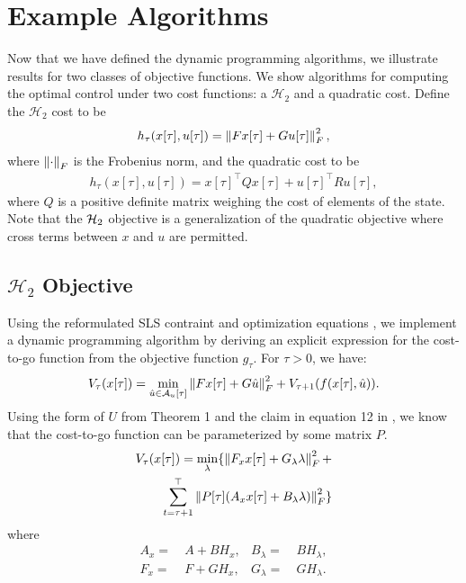 \section{Example Algorithms}\label{sec:examples}
Now that we have defined the dynamic programming algorithms, we illustrate results for two classes of objective functions.
We show algorithms for computing the optimal control under two cost functions: a $\mathcal{H}_2$ and a quadratic cost.
Define the $\mathcal{H}_2$ cost to be 
\begin{align*} %
    h_{\tau}(x[\tau],u[\tau]) = \norm{ Fx[\tau]+Gu[\tau] }_F^2,
\end{align*}
where $\left\lVert \cdot \right\rVert_F$ is the Frobenius norm, and the quadratic cost to be 
\begin{align*} %
    h_{\tau}(x[\tau],u[\tau]) = x[\tau]^\top  Q x[\tau] + u[\tau]^\top  R u[\tau],
\end{align*}
where $Q$ is a positive definite matrix weighing the cost of elements of the state. Note that the $\mathcal{H}_2$ objective is a generalization of the 
quadratic objective where cross terms between $x$ and $u$ are permitted.

\subsection{$\mathcal{H}_2$ Objective}
Using the reformulated SLS contraint and optimization equations ,
we implement a dynamic programming algorithm by deriving an explicit 
expression for the cost-to-go function from the objective function $g_{\tau}$. For $\tau > 0$, we have:
\begin{align*} %
V_{\tau}(x[\tau]) = \min\limits_{\hat{u} \in \Acal_u[\tau]} \norm{ Fx[\tau]+ G \hat{u} }_F^2 +
V_{\tau+1}(f(x[\tau],\hat{u})).
\end{align*}
Using the form of $U$ from Theorem 1 and the claim in equation 12 in \cite{tseng2020system}, 
we know that the cost-to-go function can be parameterized by some matrix $P$.
\begin{equation*}
    \begin{aligned}
        V_{\tau}(x[\tau]) = \min_{\lambda} \{ \left\lVert  F_x x[\tau] + G_{\lambda} \lambda  \right\rVert_F^2 + \\
        \sum_{t=\tau+1}^\top  \left\lVert  P[\tau] (A_x x[\tau] + B_{\lambda} \lambda )  \right\rVert_F^2 \} \\
    \end{aligned}
\end{equation*}
where
\begin{align*}
    A_x =&\ A + BH_x, & B_{\lambda}=&\ BH_{\lambda},\\
    F_x =&\ F + GH_x, & G_{\lambda}=&\ GH_{\lambda}.
\end{align*}

